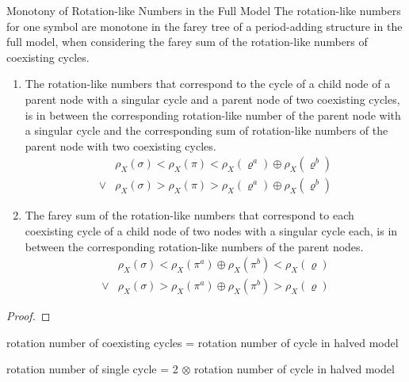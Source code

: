 \begin{theorem}{Monotony of Rotation-like Numbers in the Full Model}
    The rotation-like numbers for one symbol are monotone in the farey tree of a period-adding structure in the full model, when considering the farey sum of the rotation-like numbers of coexisting cycles.
    \begin{enumerate}
        \item The rotation-like numbers that correspond to the cycle of a child node of a parent node with a singular cycle and a parent node of two coexisting cycles, is in between the corresponding rotation-like number of the parent node with a singular cycle and the corresponding sum of rotation-like numbers of the parent node with two coexisting cycles.
              \begin{align*}
                       & \rho_X(\sigma) < \rho_X(\pi) < \rho_X(\varrho^a) \oplus \rho_X(\varrho^b) \\
                  \lor & \rho_X(\sigma) > \rho_X(\pi) > \rho_X(\varrho^a) \oplus \rho_X(\varrho^b)
              \end{align*}
        \item The farey sum of the rotation-like numbers that correspond to each coexisting cycle of a child node of two nodes with a singular cycle each, is in between the corresponding rotation-like numbers of the parent nodes.
              \begin{align*}
                       & \rho_X(\sigma) < \rho_X(\pi^a) \oplus \rho_X(\pi^b) < \rho_X(\varrho) \\
                  \lor & \rho_X(\sigma) > \rho_X(\pi^a) \oplus \rho_X(\pi^b) > \rho_X(\varrho)
              \end{align*}
    \end{enumerate}
\end{theorem}

\begin{proof}
\end{proof}


rotation number of coexisting cycles = rotation number of cycle in halved model

rotation number of single cycle = 2 $\otimes$ rotation number of cycle in halved model